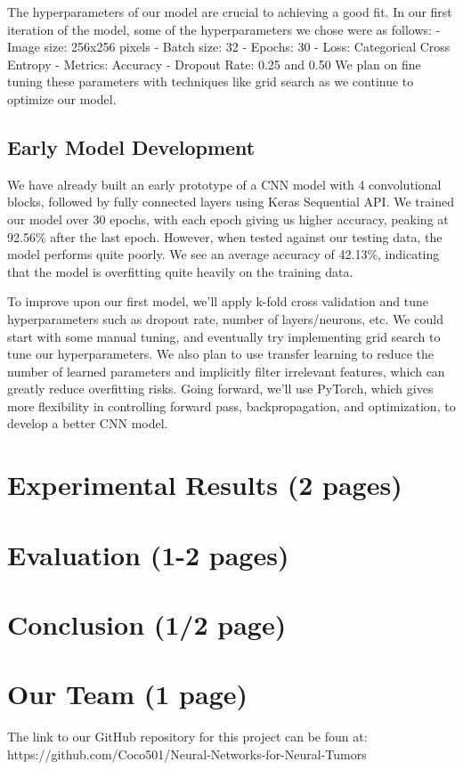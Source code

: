 \documentclass[conference]{IEEEtran}
\begin{document}
The hyperparameters of our model are crucial to achieving a good fit. In our first iteration of the model, some of the hyperparameters we chose were as follows:
- Image size: 256x256 pixels		- Batch size: 32		- Epochs: 30	
- Loss:  Categorical Cross Entropy 	- Metrics: Accuracy		- Dropout Rate: 0.25 and 0.50
We plan on fine tuning these parameters with techniques like grid search as we continue to optimize our model. 

\subsection{\large Early Model Development}

We have already built an early prototype of a CNN model with 4 convolutional blocks, followed by fully connected layers using Keras Sequential API. We trained our model over 30 epochs, with each epoch giving us higher accuracy, peaking at 92.56\% after the last epoch. However, when tested against our testing data, the model performs quite poorly. We see an average accuracy of 42.13\%, indicating that the model is overfitting quite heavily on the training data.

To improve upon our first model, we'll apply k-fold cross validation and tune hyperparameters such as dropout rate, number of layers/neurons, etc. We could start with some manual tuning, and eventually try implementing grid search to tune our hyperparameters. We also plan to use transfer learning to reduce the number of learned parameters and implicitly filter irrelevant features, which can greatly reduce overfitting risks. Going forward, we'll use PyTorch, which gives more flexibility in controlling forward pass, backpropagation, and optimization, to develop a better CNN model.


\section{\large Experimental Results (2 pages)}

\section{\large Evaluation (1-2 pages)}

\section{\large Conclusion (1/2 page)}

\section{\large Our Team (1 page)}
The link to our GitHub repository for this project can be foun at: https://github.com/Coco501/Neural-Networks-for-Neural-Tumors
\end{document}
